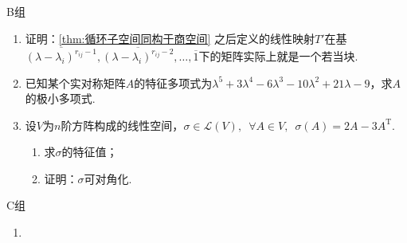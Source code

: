 \centerline{\heiti B组}
\begin{enumerate}
    \item 证明：\autoref{thm:循环子空间同构于商空间} 之后定义的线性映射$T'$在基$\overline{(\lambda-\lambda_i)^{r_{ij}-1}},\overline{(\lambda-\lambda_i)^{r_{ij}-2}},\ldots,\overline{1}$下的矩阵实际上就是一个若当块.
    \item 已知某个实对称矩阵$A$的特征多项式为$\lambda^5+3\lambda^4-6\lambda^3-10\lambda^2+21\lambda-9$，求$A$的极小多项式.
    \item 设$V$为$n$阶方阵构成的线性空间，$\sigma\in \mathcal{L}(V),\enspace \forall A\in V,\enspace \sigma(A)=2A-3A^{\mathrm{T}}$.
          \begin{enumerate}
              \item 求$\sigma$的特征值；
              \item 证明：$\sigma$可对角化.
          \end{enumerate}
\end{enumerate}

\centerline{\heiti C组}
\begin{enumerate}
    \item
\end{enumerate}
